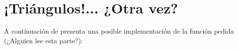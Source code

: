 \section{¡Triángulos!... ¿Otra vez?}

A continuación de presenta una posible implementación de la función pedida (¿Alguien lee esta parte?):
  

